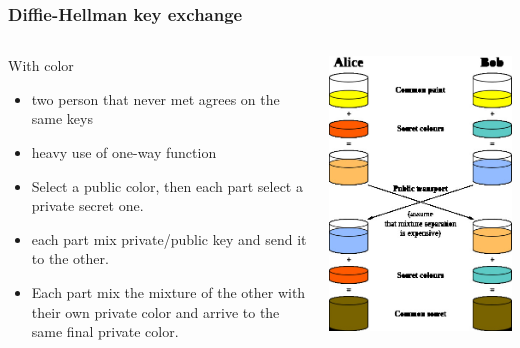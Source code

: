 \begin{frame}
\frametitle{Diffie-Hellman key exchange}
\begin{columns}[c]
\begin{block}{With color}
\begin{itemize}
\item two person that never met agrees on the same keys
\item heavy use of one-way function
\item Select a public color, then each part select a private secret one.
\item each part mix private/public key and send it to the other.
\item Each part mix the mixture of the other with their own private color and
arrive to the same final private color.
\end{itemize}
\end{block}
\includegraphics[height=.8\textheight]{./materials/diffie-hellman}
\end{columns}
\end{frame}
